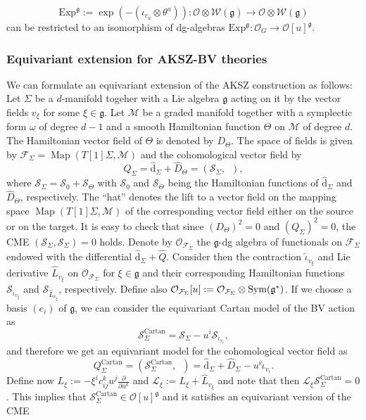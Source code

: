 \documentclass[11pt,colorinlistoftodos]{amsart}
\numberwithin{equation}{subsection}
\theoremstyle{plain}
\theoremstyle{definition}
\theoremstyle{remark}
\newcommand{\dd}{{\mathrm{d}}}
\newcommand{\de}{\partial}
\newcommand{\calS}{\mathcal{S}}
\newcommand{\calO}{\mathcal{O}}
\newcommand{\calL}{\mathcal{L}}
\newcommand{\calM}{\mathcal{M}}
\newcommand{\calW}{\mathcal{W}}
\newcommand{\calF}{\mathcal{F}}
\DeclareMathOperator{\Map}{Map}
\newcommand{\Sym}{\textnormal{Sym}}
\begin{document}
\[
\mathrm{Exp}^\mathfrak{\mathfrak{g}}:=\exp\left(-(\iota_{e_a}\otimes\theta^a)\right)\colon \calO\otimes \calW(\mathfrak{g})\to \calO\otimes \calW(\mathfrak{g})
\]
can be restricted to an isomorphism of dg-algebras $\mathrm{Exp}^{\mathfrak{g}}\colon \calO_G\to \calO[u]^\mathfrak{g}$.


\subsubsection{Equivariant extension for AKSZ-BV theories} 
We can formulate an equivariant extension of the AKSZ construction as follows: Let $\Sigma$ be a $d$-manifold togeher with a Lie algebra $\mathfrak{g}$ acting on it by the vector fields $v_\xi$ for some $\xi\in\mathfrak{g}$. Let $\calM$ be a graded manifold together with a symplectic form $\omega$ of degree $d-1$ and a smooth Hamiltonian function $\Theta$ on $\calM$ of degree $d$. The Hamiltonian vector field of $\Theta$ is denoted by $D_\Theta$. The space of fields is given by $\calF_\Sigma=\Map(T[1]\Sigma,\calM)$ and the cohomological vector field by
\[
Q_\Sigma=\hat{\dd}_\Sigma+\hat D_\Theta=(\calS_\Sigma,\enspace),
\]
where $\calS_\Sigma=\calS_0+\calS_\Theta$ with $\calS_0$ and $\calS_\Theta$ being the Hamiltonian functions of $\hat{\dd}_\Sigma$ and $\hat D_\Theta$, respectively. The ``hat'' denotes the lift to a vector field on the mapping space $\Map(T[1]\Sigma,\calM)$ of the corresponding vector field either on the source or on the target. It is easy to check that since $(D_\Theta)^2=0$ and $(Q_\Sigma)^2=0$, the CME $(\calS_\Sigma,\calS_\Sigma)=0$ holds. Denote by $\calO_{\calF_\Sigma}$ the $\mathfrak{g}$-dg algebra of functionals on $\calF_\Sigma$ endowed with the differential $\hat{\dd}_\Sigma+\hat Q$. Consider then the contraction $\hat\iota_{v_\xi}$ and Lie derivative $\hat L_{v_\xi}$ on $\calO_{\calF_\Sigma}$ for $\xi\in\mathfrak{g}$ and their corresponding Hamiltonian functions $\calS_{\hat\iota_{v_\xi}}$ and $\calS_{\hat L_{v_\xi}}$, respectively. Define also $\calO_{\calF_\Sigma}[u]:=\calO_{\calF_\Sigma}\otimes \Sym(\mathfrak{g}^*)$. If we choose a basis $(e_i)$ of $\mathfrak{g}$, we can consider the equivariant Cartan model of the BV action as 
\[
\calS_\Sigma^\mathrm{Cartan}=\calS_\Sigma-u^i\calS_{\hat\iota_{v_i}},
\]
and therefore we get an equivariant model for the cohomological vector field as 
\[
Q_{\Sigma}^\mathrm{Cartan}=(\calS_\Sigma^\mathrm{Cartan},\enspace)=\hat{\dd}_\Sigma+\hat{D}_\Sigma-u^i\hat{\iota}_{v_i}.
\]
Define now $L_\xi:=-\xi^ic^k_{ij}u^j\frac{\de}{\de u^k}$ and $\calL_\xi:=L_\xi+\hat{L}_{v_\xi}$ and note that then $\calL_\xi\calS_\Sigma^\mathrm{Cartan}=0$. This implies that $\calS^\mathrm{Cartan}_\Sigma\in\calO[u]^\mathfrak{g}$ and it satisfies an equivariant version of the CME 
\end{document}
